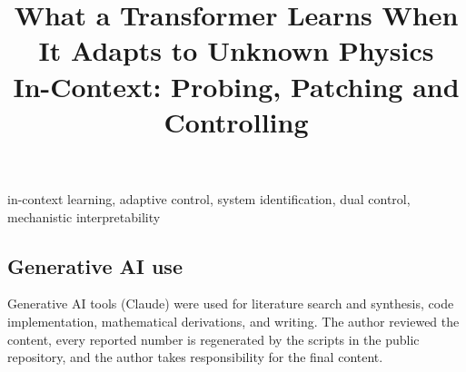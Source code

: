 \documentclass{l4dc2027}
\title[In-context adaptation to unknown physics]{What a Transformer Learns When It Adapts to Unknown Physics\\ In-Context: Probing, Patching and Controlling}
\begin{document}
\maketitle

\begin{abstract}%

\end{abstract}

\begin{keywords}%
in-context learning, adaptive control, system identification, dual control, mechanistic interpretability
\end{keywords}






\subsection*{Generative AI use}
Generative AI tools (Claude) were used for literature search and synthesis, code implementation, mathematical
derivations, and writing. The author reviewed the content, every reported number is regenerated by the scripts in the
public repository, and the author takes responsibility for the final content.



\appendix

\end{document}
